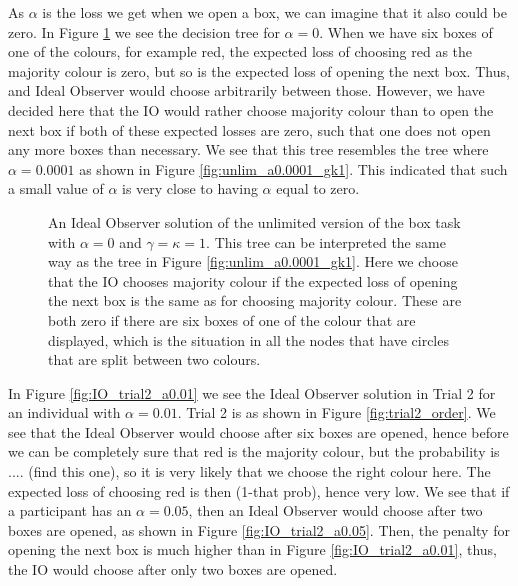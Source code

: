 As $\alpha$ is the loss we get when we open a box, we can imagine that it also could be zero. In Figure \ref{fig:unlim_a0_gk1} we see the decision tree for $\alpha=0$. When we have six boxes of one of the colours, for example red, the expected loss of choosing red as the majority colour is zero, but so is the expected loss of opening the next box. Thus, and Ideal Observer would choose arbitrarily between those. However, we have decided here that the IO would rather choose majority colour than to open the next box if both of these expected losses are zero, such that one does not open any more boxes than necessary. We see that this tree resembles the tree where $\alpha=0.0001$ as shown in Figure \ref{fig:unlim_a0.0001_gk1}. This indicated that such a small value of $\alpha$ is very close to having $\alpha$ equal to zero. 
\begin{figure}
    \centering
    \scalebox{0.5}{}
    \caption[IO solution, unlimited. $\alpha=0$, $\gamma=\kappa=1$]{An Ideal Observer solution of the unlimited version of the box task with $\alpha = 0$ and $\gamma=\kappa=1$. This tree can be interpreted the same way as the tree in Figure \ref{fig:unlim_a0.0001_gk1}.  Here we choose that the IO chooses majority colour if the expected loss of opening the next box is the same as for choosing majority colour. These are both zero if there are six boxes of one of the colour that are displayed, which is the situation in all the nodes that have circles that are split between two colours.}
    \label{fig:unlim_a0_gk1}
\end{figure}

In Figure \ref{fig:IO_trial2_a0.01} we see the Ideal Observer solution in Trial 2 for an individual with $\alpha=0.01$. Trial 2 is as shown in Figure \ref{fig:trial2_order}. We see that the Ideal Observer would choose after six boxes are opened, hence before we can be completely sure that red is the majority colour, but the probability is .... (find this one), so it is very likely that we choose the right colour here. The expected loss of choosing red is then (1-that prob), hence very low. 
We see that if a participant has an $\alpha=0.05$, then an Ideal Observer would choose after two boxes are opened, as shown in Figure \ref{fig:IO_trial2_a0.05}. Then, the penalty for opening the next box is much higher than in Figure \ref{fig:IO_trial2_a0.01}, thus, the IO would choose after only two boxes are opened. 



